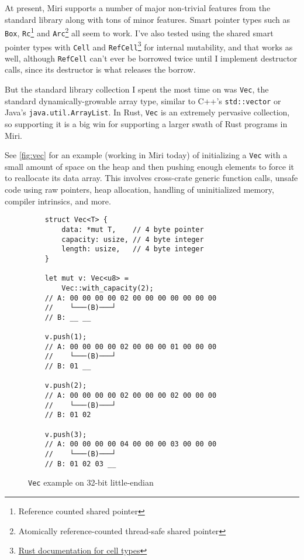 \documentclass[twocolumn]{article}
\newcommand{\rust}[1]{\texttt{#1}}
\begin{document}
At present, Miri supports a number of major non-trivial features from the standard library along
with tons of minor features. Smart pointer types such as \rust{Box}, \rust{Rc}\footnote{Reference
counted shared pointer} and \rust{Arc}\footnote{Atomically reference-counted thread-safe shared
pointer} all seem to work. I've also tested using the shared smart pointer types with \rust{Cell}
and \rust{RefCell}\footnote{\href{https://doc.rust-lang.org/stable/std/cell/index.html}{Rust
documentation for cell types}} for internal mutability, and that works as well, although
\rust{RefCell} can't ever be borrowed twice until I implement destructor calls, since its destructor
is what releases the borrow.

But the standard library collection I spent the most time on was \rust{Vec}, the standard
dynamically-growable array type, similar to C++'s \texttt{std::vector} or Java's
\texttt{java.util.ArrayList}. In Rust, \rust{Vec} is an extremely pervasive collection, so
supporting it is a big win for supporting a larger swath of Rust programs in Miri.

See \autoref{fig:vec} for an example (working in Miri today) of initializing a \rust{Vec} with a
small amount of space on the heap and then pushing enough elements to force it to reallocate its
data array. This involves cross-crate generic function calls, unsafe code using raw pointers, heap
allocation, handling of uninitialized memory, compiler intrinsics, and more.

\begin{figure}[t]
  \begin{verbatim}
    struct Vec<T> {
        data: *mut T,    // 4 byte pointer
        capacity: usize, // 4 byte integer
        length: usize,   // 4 byte integer
    }

    let mut v: Vec<u8> =
        Vec::with_capacity(2);
    // A: 00 00 00 00 02 00 00 00 00 00 00 00
    //    └───(B)───┘
    // B: __ __

    v.push(1);
    // A: 00 00 00 00 02 00 00 00 01 00 00 00
    //    └───(B)───┘
    // B: 01 __

    v.push(2);
    // A: 00 00 00 00 02 00 00 00 02 00 00 00
    //    └───(B)───┘
    // B: 01 02

    v.push(3);
    // A: 00 00 00 00 04 00 00 00 03 00 00 00
    //    └───(B)───┘
    // B: 01 02 03 __
  \end{verbatim}
  \caption{\rust{Vec} example on 32-bit little-endian}
  \label{fig:vec}
\end{figure}
\end{document}
